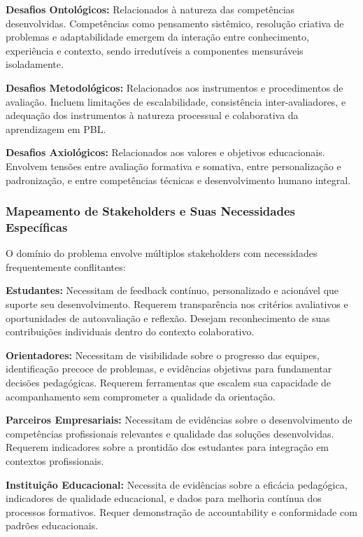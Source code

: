 \documentclass[english, spanish, brazilian]{modelo_dt}
\begin{document}
\textbf{Desafios Ontológicos:} Relacionados à natureza das competências desenvolvidas. Competências como pensamento sistêmico, resolução criativa de problemas e adaptabilidade emergem da interação entre conhecimento, experiência e contexto, sendo irredutíveis a componentes mensuráveis isoladamente.

\textbf{Desafios Metodológicos:} Relacionados aos instrumentos e procedimentos de avaliação. Incluem limitações de escalabilidade, consistência inter-avaliadores, e adequação dos instrumentos à natureza processual e colaborativa da aprendizagem em PBL.

\textbf{Desafios Axiológicos:} Relacionados aos valores e objetivos educacionais. Envolvem tensões entre avaliação formativa e somativa, entre personalização e padronização, e entre competências técnicas e desenvolvimento humano integral.

\subsubsection{Mapeamento de Stakeholders e Suas Necessidades Específicas}

O domínio do problema envolve múltiplos stakeholders com necessidades
frequentemente conflitantes:

\textbf{Estudantes:} Necessitam de feedback contínuo, personalizado e acionável que suporte seu desenvolvimento. Requerem transparência nos critérios avaliativos e oportunidades de autoavaliação e reflexão. Desejam reconhecimento de suas contribuições individuais dentro do contexto colaborativo.

\textbf{Orientadores:} Necessitam de visibilidade sobre o progresso das equipes, identificação precoce de problemas, e evidências objetivas para fundamentar decisões pedagógicas. Requerem ferramentas que escalem sua capacidade de acompanhamento sem comprometer a qualidade da orientação.

\textbf{Parceiros Empresariais:} Necessitam de evidências sobre o desenvolvimento de competências profissionais relevantes e qualidade das soluções desenvolvidas. Requerem indicadores sobre a prontidão dos estudantes para integração em contextos profissionais.

\textbf{Instituição Educacional:} Necessita de evidências sobre a eficácia pedagógica, indicadores de qualidade educacional, e dados para melhoria contínua dos processos formativos. Requer demonstração de accountability e conformidade com padrões educacionais.
\end{document}
